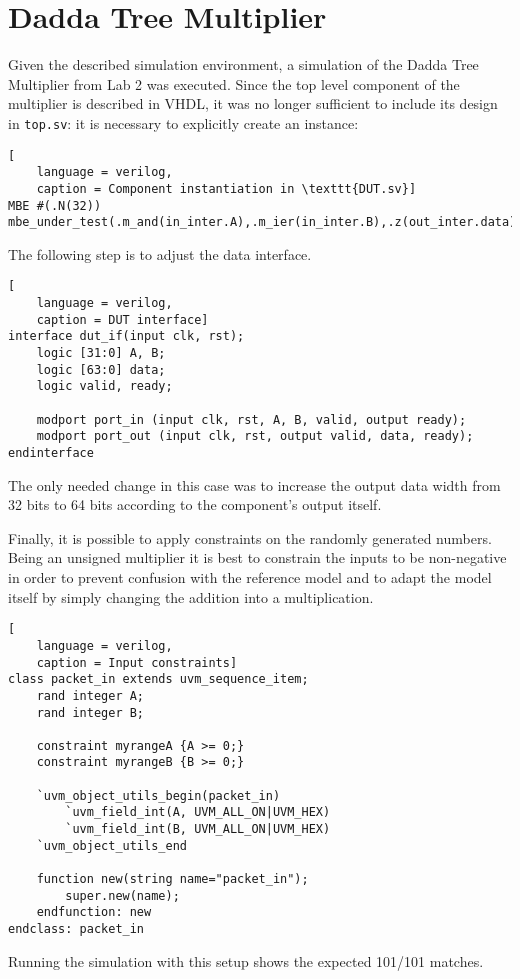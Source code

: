 \chapter{Dadda Tree Multiplier}
Given the described simulation environment, a simulation of the Dadda Tree Multiplier from Lab 2 was executed.
Since the top level component of the multiplier is described in VHDL, it was no longer sufficient to include its design
in \texttt{top.sv}: it is necessary to explicitly create an instance:
\begin{lstlisting}[
    language = verilog,
    caption = Component instantiation in \texttt{DUT.sv}]
MBE #(.N(32)) mbe_under_test(.m_and(in_inter.A),.m_ier(in_inter.B),.z(out_inter.data));
\end{lstlisting}

The following step is to adjust the data interface.

\begin{lstlisting}[
    language = verilog,
    caption = DUT interface]
interface dut_if(input clk, rst);
    logic [31:0] A, B;
    logic [63:0] data;
    logic valid, ready;

    modport port_in (input clk, rst, A, B, valid, output ready);
    modport port_out (input clk, rst, output valid, data, ready);
endinterface
\end{lstlisting}
The only needed change in this case was to increase the output data width from 32 bits to 64 bits according to the
component's output itself.

Finally, it is possible to apply constraints on the randomly generated numbers. Being an unsigned multiplier it is
best to constrain the inputs to be non-negative in order to prevent confusion with the reference model and to adapt
the model itself by simply changing the addition into a multiplication.

\begin{lstlisting}[
    language = verilog,
    caption = Input constraints]
class packet_in extends uvm_sequence_item;
    rand integer A;
    rand integer B;

	constraint myrangeA {A >= 0;}
	constraint myrangeB {B >= 0;}

    `uvm_object_utils_begin(packet_in)
        `uvm_field_int(A, UVM_ALL_ON|UVM_HEX)
        `uvm_field_int(B, UVM_ALL_ON|UVM_HEX)
    `uvm_object_utils_end

    function new(string name="packet_in");
        super.new(name);
    endfunction: new
endclass: packet_in

\end{lstlisting}

Running the simulation with this setup shows the expected 101/101 matches.
